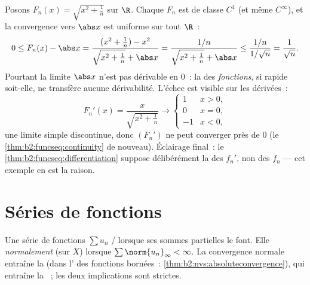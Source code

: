 \begin{example}\label{ex:b2:funcseq:sqrtabs}
Posons $F_n(x) = \sqrt{x^2 + \frac1n}$ sur $\R$. Chaque $F_n$ est
de classe $C^1$ (et même $C^\infty$), et la convergence vers $\abs x$
est uniforme sur tout $\R$~:
\[
0 \leq F_n(x) - \abs x
= \frac{(x^2 + \frac1n) - x^2}{\sqrt{x^2+\frac1n} + \abs x}
= \frac{1/n}{\sqrt{x^2 + \frac1n} + \abs x}
\leq \frac{1/n}{1/\sqrt n} = \frac{1}{\sqrt n} .
\]
Pourtant la limite $\abs x$ n'est pas dérivable en $0$~: la
 des \emph{fonctions}, si rapide soit-elle, ne
transfère aucune dérivabilité. L'échec est visible sur les dérivées~:
\[
F_n'(x) = \frac{x}{\sqrt{x^2 + \frac1n}}
\longrightarrow \begin{cases} 1 & x > 0,\\ 0 & x = 0,\\
-1 & x < 0, \end{cases}
\]
une limite simple discontinue, donc $(F_n')$ ne peut converger
 près de $0$ (le \cref{thm:b2:funcseq:continuity} de
nouveau). Éclairage final~:
le \cref{thm:b2:funcseq:differentiation} suppose délibérément la
 des $f_n'$, non des $f_n$ ---
cet exemple en est la raison.
\end{example}

\section{Séries de fonctions}

\begin{definition}\label{def:b2:funcseq:series}
Une série de fonctions $\sum u_n$  /
lorsque ses sommes partielles le font. Elle 
\emph{normalement} (sur $X$) lorsque $\sum
\norm{u_n}_\infty < \infty$. La convergence normale entraîne la
 (dans l' des fonctions bornées~:
\cref{thm:b2:nvs:absoluteconvergence}), qui entraîne la ~; les deux implications sont strictes.
\end{definition}

